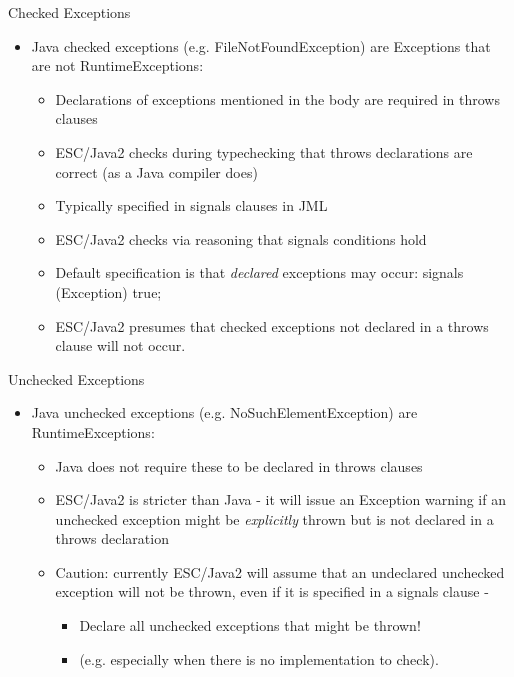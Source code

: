 \documentclass[
pdf,
nocolorBG,
slideColor,
cok,
]{prosper}
\begin{document}
\begin{slide}{Checked Exceptions}
\vspace*{-6ex}
\begin{itemize}
\item Java {\knalblue checked} exceptions (e.g. FileNotFoundException) are Exceptions that are not RuntimeExceptions:
\begin{itemize}
\item Declarations of exceptions mentioned in the body are required in throws clauses
\item ESC/Java2 checks during typechecking that throws declarations are correct (as a Java compiler does)
\item Typically specified in signals clauses in JML
\item ESC/Java2 checks via reasoning that signals conditions hold
\item Default specification is that {\it declared} exceptions may occur:  signals (Exception) true;
\item ESC/Java2 presumes that checked exceptions not declared in a throws clause will not occur.
\end{itemize}
\end{itemize}
\end{slide}

\begin{slide}{Unchecked Exceptions}

\vspace*{-6ex}
\begin{itemize}
\item Java {\knalblue unchecked} exceptions (e.g. NoSuchElementException) are RuntimeExceptions:
\begin{itemize}
\item Java does not require these to be declared in throws clauses
\item ESC/Java2 is stricter than Java - it will issue an Exception warning if an unchecked exception might be {\it explicitly} thrown but is not declared in a throws declaration 
\item Caution: currently ESC/Java2 will assume that an undeclared unchecked exception will not be thrown, even if it is specified in a signals clause - 
\begin{itemize}
\item[] Declare all unchecked exceptions that might be thrown! 
\item[] (e.g. especially when there is no implementation to check).
\end{itemize}
\end{itemize}

\end{itemize}
\end{slide}
\end{document}
